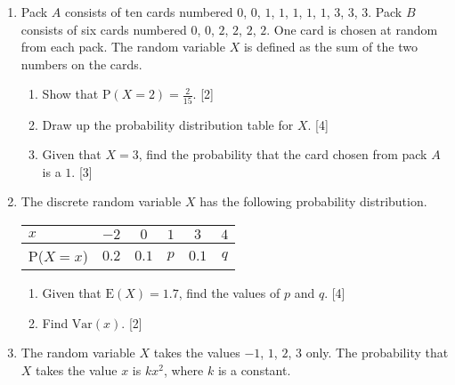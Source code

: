 \begin{enumerate}
	
	\item Pack $A$ consists of ten cards numbered $0$, $0$, $1$, $1$, $1$, $1$, $1$, $3$, $3$, $3$. Pack $B$ consists of six cards	numbered $0$, $0$, $2$, $2$, $2$, $2$. One card is chosen at random from each pack. The random variable $X$ is defined as the sum of the two numbers on the cards.
	
	\begin{enumerate}
		\item Show that $\text{P}(X=2) = \frac{2}{15}$. \hfill [2]
		\item Draw up the probability distribution table for $X$. \hfill [4]
		\item Given that $X = 3$, find the probability that the card chosen from pack $A$ is a $1$. \hfill [3]
	\end{enumerate}
	

\item	The discrete random variable $X$ has the following probability distribution.
 
 \begin{table}[!htpb]
 	
 	\centering
 	
 	\begin{tabular}{|l|c|c|c|c|c|}
 		\hline
 		$x $     & $-2$ & $0$ &  $1$ & $3$ & $4$ \\ \hline
 		P($X=x$) & $0.2$ & $0.1$ & $p$ &$0.1$ & $q$ \\ \hline
 	\end{tabular}
 \end{table}

\begin{enumerate}
	\item Given that $\text{E}(X) =1.7$, find the values of $p$ and $q$. \hfill[4]
	\item Find $\text{Var}(x)$. \hfill [2] 
\end{enumerate}



\item  The random variable $X$ takes the values $-1$, $1$, $2$, $3$ only. The probability that $X$ takes the value $x$ is $kx^2$, where $k$ is a constant.


\end{enumerate}
